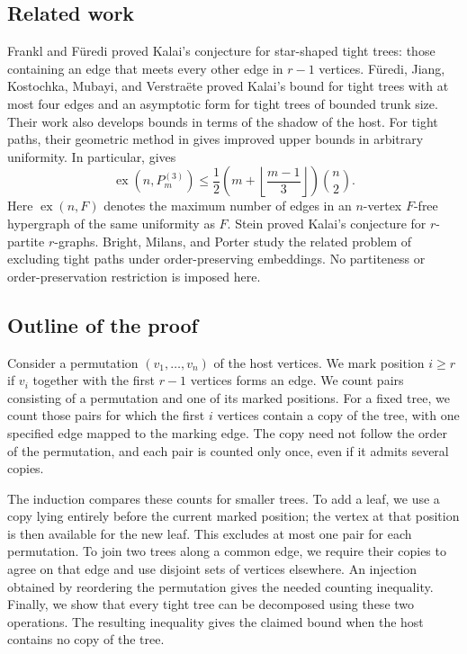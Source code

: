 \documentclass[11pt]{article}
\numberwithin{equation}{section}
\theoremstyle{definition}
\newcommand{\ex}{\operatorname{ex}}
\begin{document}
\subsection{Related work}

Frankl and F\"uredi \cite[Theorem~3.8]{FF1987} proved Kalai's
conjecture for star-shaped tight trees: those containing an edge that
meets every other edge in $r-1$ vertices.
F\"uredi, Jiang, Kostochka, Mubayi, and Verstra\"ete
\cite{FJKMV2019} proved Kalai's bound for tight trees with at most four
edges and an asymptotic form for tight trees of bounded trunk size.
Their work also develops bounds in terms of the shadow of the host.
For tight paths, their geometric method in \cite{FJKMV2020} gives
improved upper bounds in arbitrary uniformity.  In particular,
\cite[Theorem~1.2]{FJKMV2020} gives
\[
 \ex(n,P_m^{(3)})\leq
 \frac12\left(m+\left\lfloor\frac{m-1}{3}\right\rfloor\right)
 \binom n2.
\]
Here $\ex(n,F)$ denotes the maximum number of edges in an $n$-vertex
$F$-free hypergraph of the same uniformity as $F$.
Stein \cite{Stein2024} proved Kalai's conjecture for $r$-partite
$r$-graphs.  Bright, Milans, and Porter \cite{BMP2025} study the related
problem of excluding tight paths under order-preserving embeddings.
No partiteness or order-preservation restriction is imposed here.

\subsection{Outline of the proof}

Consider a permutation $(v_1,\ldots,v_n)$ of the host vertices.
We mark position $i\geq r$ if $v_i$ together with the first $r-1$
vertices forms an edge.  We count pairs consisting
of a permutation and one of its marked positions.  For a fixed tree,
we count those pairs for which the first $i$ vertices contain a copy
of the tree, with one specified edge mapped to the marking edge.
The copy need not follow the order of the permutation, and each pair
is counted only once, even if it admits several copies.

The induction compares these counts for smaller trees.  To add a leaf,
we use a copy lying entirely before the current marked position;
the vertex at that position is then available for the new leaf.
This excludes at most one pair for each permutation.  To join two
trees along a common edge, we require their copies to agree on that
edge and use disjoint sets of vertices elsewhere.  An injection
obtained by reordering the permutation gives the needed counting
inequality.  Finally, we show that every tight tree can be decomposed
using these two operations.  The resulting inequality gives the
claimed bound when the host contains no copy of the tree.
\end{document}

